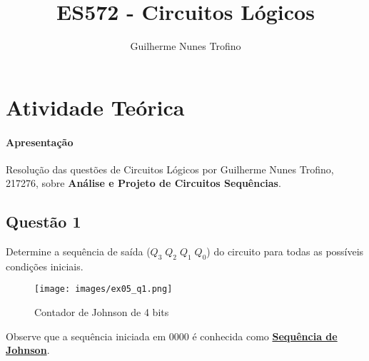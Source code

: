 \documentclass{article}
\title{ES572 - Circuitos Lógicos}
\author{Guilherme Nunes Trofino}
\begin{document}
\maketitle
\newpage

\section{Atividade Teórica}
\paragraph{Apresentação}Resolução das questões de Circuitos Lógicos por Guilherme Nunes Trofino, 217276, sobre \textbf{Análise e Projeto de Circuitos Sequências}.

\subsection{Questão 1}
    \begin{exercise}
        Determine a sequência de saída ($Q_3 \; Q_2 \; Q_1 \; Q_0$) do circuito para todas as possíveis condições iniciais.
        \begin{figure}[H]
            \centering
            \texttt{[image: images/ex05\_q1.png]}
            \caption{Contador de Johnson de 4 bits}
        \end{figure}
        Observe que a sequência iniciada em 0000 é conhecida como \href{http://www.fem.unicamp.br/~grace/circuitos_sequenciais.pdf}{\textbf{Sequência de Johnson}}.
    \end{exercise}
\end{document}
